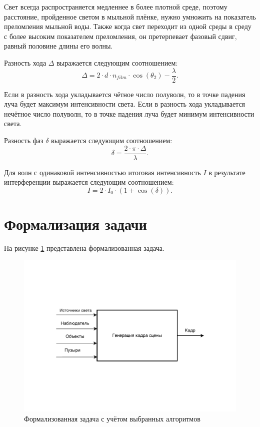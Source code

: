 Свет всегда распространяется медленнее в более плотной среде, поэтому расстояние, пройденное светом в мыльной плёнке, нужно умножить на показатель преломления мыльной воды. Также когда свет переходит из одной среды в среду с более высоким показателем преломления, он претерпевает фазовый сдвиг, равный половине длины его волны. 

Разность хода $\Delta$ выражается следующим соотношением:
\begin{equation}
	\Delta = 2 \cdot d \cdot n_{film} \cdot \cos(\theta_2) - \frac{\lambda}{2}.
\end{equation}

Если в разность хода укладывается чётное число полуволн, то в точке падения луча будет максимум интенсивности света. Если в разность хода укладывается нечётное число полуволн, то в точке падения луча будет минимум интенсивности света.

Разность фаз $\delta$ выражается следующим соотношением:
\begin{equation}
	\delta = \frac{2 \cdot \pi \cdot \Delta}{\lambda}.
\end{equation}

Для волн с одинаковой интенсивностью итоговая интенсивность $I$ в результате интерференции выражается следующим соотношением:
\begin{equation}
	I = 2 \cdot I_0 \cdot (1 + \cos(\delta)).
\end{equation}

\clearpage


\section{Формализация задачи}

На рисунке \ref{img:idef0_form} представлена формализованная задача.

\begin{figure}[h]
	\begin{center}
		\includegraphics[width=\linewidth]{img/idef0_form.pdf}
	\end{center}
	\captionsetup{justification=centering}
	\caption{Формализованная задача с учётом выбранных алгоритмов}
	\label{img:idef0_form}
\end{figure}

